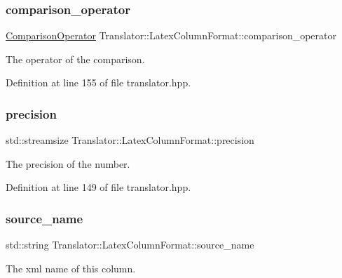 \subsubsection{\texorpdfstring{comparison\+\_\+operator}{comparison\_operator}}
{\footnotesize\ttfamily \hyperlink{classTranslator_1_1LatexColumnFormat_a9401c4c02f92f224268e919aac9cb15e}{Comparison\+Operator} Translator\+::\+Latex\+Column\+Format\+::comparison\+\_\+operator}



The operator of the comparison. 



Definition at line 155 of file translator.\+hpp.

\mbox{\label{classTranslator_1_1LatexColumnFormat_adeb95b0be6d9473d4d8118fa92f98d49}} 
\subsubsection{\texorpdfstring{precision}{precision}}
{\footnotesize\ttfamily std\+::streamsize Translator\+::\+Latex\+Column\+Format\+::precision}



The precision of the number. 



Definition at line 149 of file translator.\+hpp.

\mbox{\label{classTranslator_1_1LatexColumnFormat_a42670e56493331d9ec3bdad1ea71b7c0}} 
\subsubsection{\texorpdfstring{source\+\_\+name}{source\_name}}
{\footnotesize\ttfamily std\+::string Translator\+::\+Latex\+Column\+Format\+::source\+\_\+name}



The xml name of this column. 




